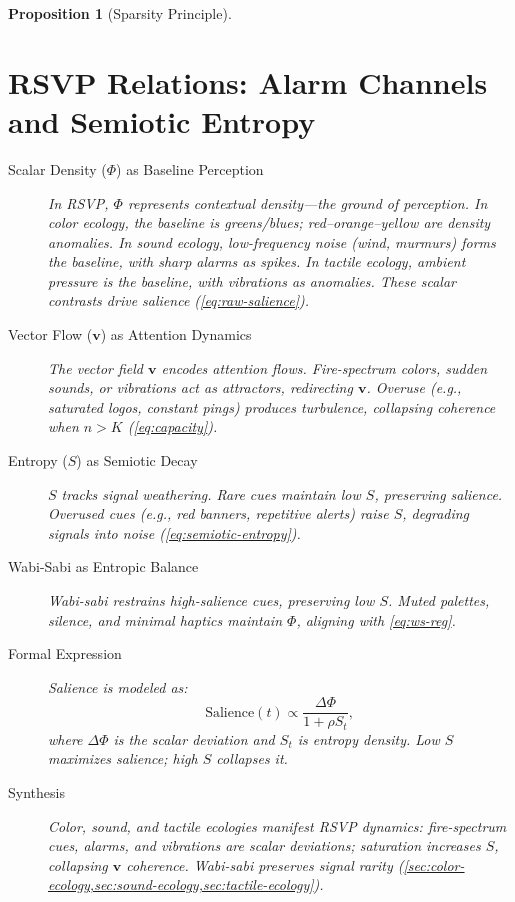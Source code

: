 \documentclass[openany]{book}
\newtheorem{proposition}{Proposition}[chapter]
\newcommand{\PhiS}{\Phi} %
\newcommand{\vvec}{\mathbf{v}} %
\newcommand{\Sent}{S} %
\begin{document}
\begin{proposition}[Sparsity Principle]
\section{RSVP Relations: Alarm Channels and Semiotic Entropy}
\label{sec:rsvp-relations}
\begin{description}
  \item[Scalar Density (\(\PhiS\)) as Baseline Perception] In RSVP, \(\PhiS\) represents contextual density—the ground of perception. In color ecology, the baseline is greens/blues; red–orange–yellow are density anomalies. In sound ecology, low-frequency noise (wind, murmurs) forms the baseline, with sharp alarms as spikes. In tactile ecology, ambient pressure is the baseline, with vibrations as anomalies. These scalar contrasts drive salience (\cref{eq:raw-salience}).
  \item[Vector Flow (\(\vvec\)) as Attention Dynamics] The vector field \(\vvec\) encodes attention flows. Fire-spectrum colors, sudden sounds, or vibrations act as attractors, redirecting \(\vvec\). Overuse (e.g., saturated logos, constant pings) produces turbulence, collapsing coherence when $n > K$ (\cref{eq:capacity}).
  \item[Entropy (\(\Sent\)) as Semiotic Decay] \(\Sent\) tracks signal weathering. Rare cues maintain low $\Sent$, preserving salience. Overused cues (e.g., red banners, repetitive alerts) raise $\Sent$, degrading signals into noise (\cref{eq:semiotic-entropy}).
  \item[Wabi-Sabi as Entropic Balance] Wabi-sabi restrains high-salience cues, preserving low $\Sent$. Muted palettes, silence, and minimal haptics maintain \(\PhiS\), aligning with \eqref{eq:ws-reg}.
  \item[Formal Expression] Salience is modeled as:
  \begin{equation}
  \label{eq:salience}
  \text{Salience}(t) \propto \frac{\Delta \PhiS}{1 + \rho \Sent_t},
  \end{equation}
  where $\Delta \PhiS$ is the scalar deviation and $\Sent_t$ is entropy density. Low $\Sent$ maximizes salience; high $\Sent$ collapses it.
  \item[Synthesis] Color, sound, and tactile ecologies manifest RSVP dynamics: fire-spectrum cues, alarms, and vibrations are scalar deviations; saturation increases $\Sent$, collapsing \(\vvec\) coherence. Wabi-sabi preserves signal rarity (\cref{sec:color-ecology,sec:sound-ecology,sec:tactile-ecology}).
\end{description}


\end{proposition}
\end{document}
